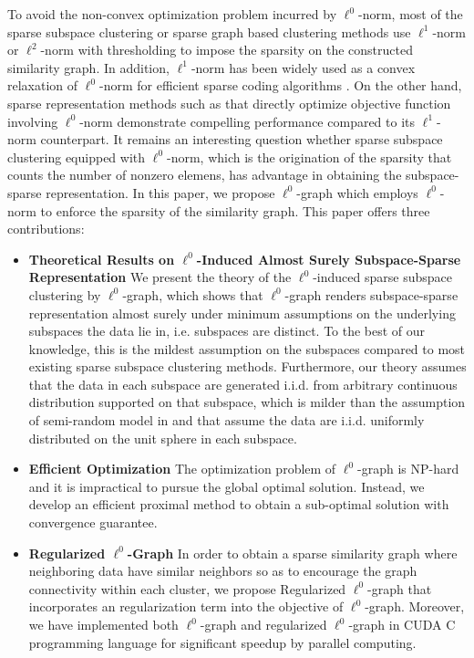\documentclass[10pt,twocolumn,letterpaper]{article}
\begin{document}
To avoid the non-convex optimization problem incurred by $\ell^{0}$-norm, most of the sparse subspace clustering or sparse graph based clustering methods use $\ell^{1}$-norm \cite{YanW09,ChengYYFH10,ElhamifarV11,ElhamifarV13,YYZRl1graphBMVC2014} or $\ell^{2}$-norm with thresholding \cite{Peng2015robust} to impose the sparsity on the constructed similarity graph. In addition, $\ell^{1}$-norm has been widely used as a convex relaxation of $\ell^{0}$-norm for efficient sparse coding algorithms \cite{jenatton2010proximal,Mairal2010,MairalBPSZ08}. On the other hand, sparse representation methods such as \cite{Mancera2006} that directly optimize objective function involving $\ell^{0}$-norm demonstrate compelling performance compared to its $\ell^{1}$-norm counterpart. It remains an interesting question whether sparse subspace clustering equipped with $\ell^{0}$-norm, which is the origination of the sparsity that counts the number of nonzero elemens, has advantage in obtaining the subspace-sparse representation. In this paper, we propose $\ell^{0}$-graph which employs $\ell^{0}$-norm to enforce the sparsity of the similarity graph. This paper offers three contributions:
\begin{itemize}
  \item[] \textbf{Theoretical Results on $\ell^{0}$-Induced Almost Surely Subspace-Sparse Representation} We present the theory of the $\ell^{0}$-induced sparse subspace clustering by $\ell^{0}$-graph, which shows that $\ell^{0}$-graph renders subspace-sparse representation almost surely under minimum assumptions on the underlying subspaces the data lie in, i.e. subspaces are distinct. To the best of our knowledge, this is the mildest assumption on the subspaces compared to most existing sparse subspace clustering methods. Furthermore, our theory assumes that the data in each subspace are generated i.i.d. from arbitrary continuous distribution supported on that subspace, which is milder than the assumption of semi-random model in \cite{ParkCS14} and \cite{Wang13} that assume the data are i.i.d. uniformly distributed on the unit sphere in each subspace.
  \item[] \textbf{Efficient Optimization} The optimization problem of $\ell^{0}$-graph is NP-hard and it is impractical to pursue the global optimal solution. Instead, we develop an efficient proximal method to obtain a sub-optimal solution with convergence guarantee.
  \item[] \textbf{Regularized $\ell^{0}$-Graph} In order to obtain a sparse similarity graph where neighboring data have similar neighbors so as to encourage the graph connectivity within each cluster, we propose Regularized $\ell^{0}$-graph that incorporates an regularization term into the objective of $\ell^{0}$-graph. Moreover, we have implemented both $\ell^{0}$-graph and regularized $\ell^{0}$-graph in CUDA C programming language for significant speedup by parallel computing.
\end{itemize}
\end{document}
